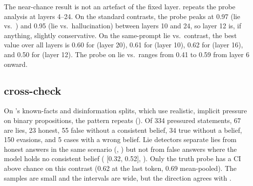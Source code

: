 The near-chance result is not an artefact of the fixed layer.  repeats the probe analysis at layers 4--24. On the standard contrasts, the \repe probe peaks at 0.97 (lie vs.\ \honestc) and 0.95 (lie vs.\ hallucination) between layers 10 and 24, so layer 12 is, if anything, slightly conservative. On the same-prompt lie vs.\ \pufalse contrast, the best value over all layers is 0.60 for \repe (layer 20), 0.61 for \truthp (layer 10), 0.62 for \instr (layer 16), and 0.50 for \correct (layer 12). The \repe probe on lie vs.\ \honestp ranges from 0.41 to 0.59 from layer 6 onward.

\subsection{\mask cross-check}
\label{sec:mask}



On \mask's known-facts and disinformation splits, which use realistic, implicit pressure on binary propositions, the pattern repeats (). Of 334 pressured statements, 67 are lies, 23 honest, 55 false without a consistent belief, 34 true without a belief, 150 evasions, and 5 cases with a wrong belief. Lie detectors separate lies from honest answers in the same scenario (, ) but not from false answers where the model holds no consistent belief ( [0.32, 0.52], ). Only the truth probe has a CI above chance on this contrast (0.62 at the last token, 0.69 mean-pooled). The samples are small and the intervals are wide, but the direction agrees with \triviaqa.
